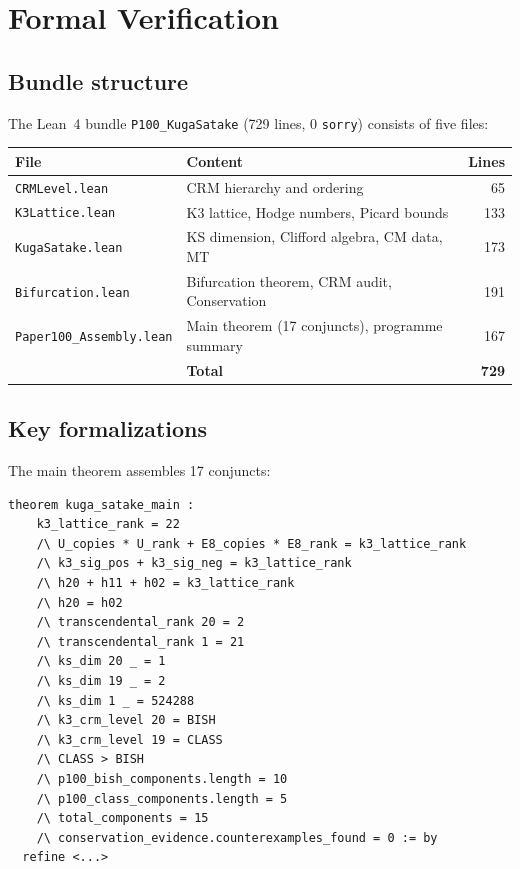 \documentclass[11pt,a4paper]{article}
\theoremstyle{plain}
\theoremstyle{definition}
\begin{document}
\section{Formal Verification}\label{sec:lean}

\subsection{Bundle structure}

The Lean~4 bundle \texttt{P100\_KugaSatake} (729 lines, 0 \texttt{sorry}) consists of five files:

\begin{center}
\begin{tabular}{llr}
\toprule
\textbf{File} & \textbf{Content} & \textbf{Lines} \\
\midrule
\texttt{CRMLevel.lean} & CRM hierarchy and ordering & 65 \\
\texttt{K3Lattice.lean} & K3 lattice, Hodge numbers, Picard bounds & 133 \\
\texttt{KugaSatake.lean} & KS dimension, Clifford algebra, CM data, MT & 173 \\
\texttt{Bifurcation.lean} & Bifurcation theorem, CRM audit, Conservation & 191 \\
\texttt{Paper100\_Assembly.lean} & Main theorem (17 conjuncts), programme summary & 167 \\
\midrule
& \textbf{Total} & \textbf{729} \\
\bottomrule
\end{tabular}
\end{center}

\subsection{Key formalizations}

The main theorem assembles 17 conjuncts:

\begin{tcolorbox}[leanbox={kuga\_satake\_main (excerpt)}]
\begin{lstlisting}[style=leanstyle]
theorem kuga_satake_main :
    k3_lattice_rank = 22
    /\ U_copies * U_rank + E8_copies * E8_rank = k3_lattice_rank
    /\ k3_sig_pos + k3_sig_neg = k3_lattice_rank
    /\ h20 + h11 + h02 = k3_lattice_rank
    /\ h20 = h02
    /\ transcendental_rank 20 = 2
    /\ transcendental_rank 1 = 21
    /\ ks_dim 20 _ = 1
    /\ ks_dim 19 _ = 2
    /\ ks_dim 1 _ = 524288
    /\ k3_crm_level 20 = BISH
    /\ k3_crm_level 19 = CLASS
    /\ CLASS > BISH
    /\ p100_bish_components.length = 10
    /\ p100_class_components.length = 5
    /\ total_components = 15
    /\ conservation_evidence.counterexamples_found = 0 := by
  refine <...>
\end{lstlisting}
\end{tcolorbox}
\end{document}

